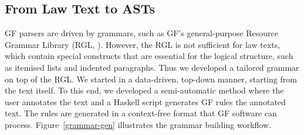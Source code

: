 \documentclass{IOS-Book-Article}
\begin{document}



\subsection{From Law Text to ASTs}
\label{sec:2.2}

GF parsers are driven by grammars, such as GF's general-purpose Resource Grammar Library (RGL, \cite{ranta-2009}).
However, the RGL is not sufficient for law texts, which contain special constructs that are essential for the logical structure, such as itemised lists and indented paragraphs.
Thus we developed a tailored grammar on top of the RGL.
We started in a data-driven, top-down manner, starting from the text itself.
To this end, we developed a semi-automatic method where the user annotates the text and a Haskell script generates GF rules the annotated text.
The rules are generated in a context-free format that GF software can process.
Figure~\ref{grammar-gen} illustrates the grammar building workflow.
\end{document}

